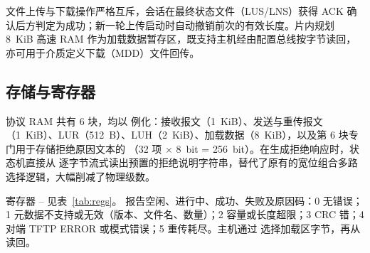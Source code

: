 文件上传与下载操作严格互斥，会话在最终状态文件（LUS/LNS）获得 ACK 确认后方判定为成功；新一轮上传启动时自动撤销前次的有效长度。片内规划 8~KiB 高速 RAM 作为加载数据暂存区，既支持主机经由配置总线按字节读回，亦可用于介质定义下载（MDD）文件回传。


\subsection{存储与寄存器}

协议 RAM 共有 6 块，均以  例化：接收报文（1~KiB）、发送与重传报文（1~KiB）、LUR（512~B）、LUH（2~KiB）、加载数据（8~KiB），以及第 6 块专门用于存储拒绝原因文本的 （32 项 $\times$ 8~bit = 256~bit）。在生成拒绝响应时，状态机直接从  逐字节流式读出预置的拒绝说明字符串，替代了原有的宽位组合多路选择逻辑，大幅削减了物理级数。

寄存器 -- 见表~\ref{tab:regs}。 报告空闲、进行中、成功、失败及原因码：0 无错误；1 元数据不支持或无效（版本、文件名、数量）；2 容量或长度超限；3 CRC 错；4 对端 TFTP ERROR 或模式错误；5 重传耗尽。主机通过  选择加载区字节，再从  读回。
\endgroup
